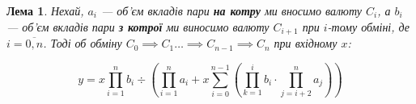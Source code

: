 \documentclass[a4paper, 12pt]{article}
\newcommand{\tqs}{\textquotesingle}
\newtheorem{lemma}{Лема}
\begin{document}
\begin{lemma} Нехай, \(a_i\) --- об'єм вкладів пари \textbf{на котру} ми вносимо
  валюту \(C_i\), а \(b_i\) --- об'єм вкладів пари \textbf{з котрої} ми виносимо валюту
	\(C_{i+1}\) при \(i\)-тому обміні, де \(i = \overline{0, n}\). Тоді об
	обміну \(C_{0} \implies C_{1} \ldots \implies C_{n-1} \implies C_{n} \) при
	вхідному \(x\):

	\begin{equation}\label{eq:nth-swap}
		y = x \prod_{i=1}^n b_i \div \left( \prod_{i=1}^{n} a_i + x \sum_{i=0}^{n-1} \left( \prod_{k=1}^i b_i \cdot \prod_{j=i+2}^{n}  a_j \right) \right)
	\end{equation}
\end{lemma}

%
%
%
%
%
%
%
%
\end{document}
